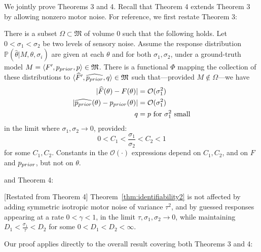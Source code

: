 We jointly prove Theorems 3 and 4. Recall that Theorem 4 extends Theorem 3 by allowing nonzero motor noise.
For reference, we first restate Theorem 3:
\begin{thm}\label{thm:identifiability2}
There is a subset $\Omega \subset \mathfrak{M}$ of volume $0$ such that the following holds.
Let $0 < \sigma_1 < \sigma_2$ be two levels of sensory noise.
Assume the 
response distribution $\mathbb{P}(\widehat{\theta}|M,\theta, \sigma_i)$ are given at each $\theta$ and for both $\sigma_1, \sigma_2$, under a ground-truth model $M = \langle F', p_{prior},p \rangle \in \mathfrak{M}$.
There is a functional $\Phi$ mapping the collection of these distributions to $\langle \widehat{F}', \widehat{p_{prior}},q \rangle \in \mathfrak{M}$
such that---provided $M \not\in \Omega$---we have
\begin{align*}
    |\widehat{F}(\theta) - F(\theta)| &= \mathcal{O}(\sigma_1^2) \\
    |\widehat{p_{prior}}(\theta) - p_{prior}(\theta)| &= \mathcal{O}(\sigma_1^2) \\
    q &= p  \text{ for $\sigma_1^2$ small}
\end{align*}
in the limit where $\sigma_1, \sigma_2 \rightarrow 0$, provided:  
\begin{equation}
0 < C_1 < \frac{\sigma_1}{\sigma_2} < C_2 < 1    
\end{equation}
for some $C_1, C_2$.
Constants in the $\mathcal{O}(\cdot)$ expressions depend on $C_1, C_2$, and on $F$ and $p_{prior}$, but not on $\theta$.
\end{thm}
and Theorem 4:
\begin{thm}\label{thm:identifiability2-motor}[Restated from Theorem 4]
Theorem~\ref{thm:identifiability2} is not affected by adding symmetric isotropic motor noise of variance $\tau^2$, and by guessed responses appearing at a rate $0 < \gamma < 1$, in the limit $\tau, \sigma_1, \sigma_2 \rightarrow 0$, while maintaining $D_1 < \frac{\sigma_1}{\tau} < D_2$ for some $0 < D_1 < D_2 < \infty$.
\end{thm}
Our proof applies directly to the overall result covering both Theorems 3 and 4:
